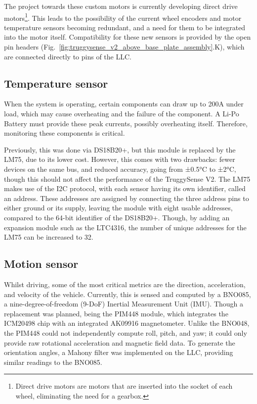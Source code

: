 \documentclass[conference,a4paper]{IEEEtran}
\let\oldsubsection\subsection
\renewcommand{\subsection}[1]{
  \setlength{\parskip}{0.5em}
  \setlength{\parindent}{0pt}
  \oldsubsection{#1}
}
\newcommand{\ParagraphSeperator}{
  \setlength{\parskip}{0em}
  \setlength{\parindent}{10pt}
}
\begin{document}
\ParagraphSeperator
The project towards these custom motors is currently developing direct drive motors\footnote{Direct drive motors are motors that are inserted into the socket of each wheel, eliminating the need for a gearbox.}.
This leads to the possibility of the current wheel encoders and motor temperature sensors becoming redundant, and a need for them to be integrated into the motor itself.
Compatibility for these new sensors is provided by the open pin headers (Fig.~\ref{fig:truggysense_v2_above_base_plate_assembly}.K), which are connected directly to pins of the LLC.

\subsection{Temperature sensor}
\ParagraphSeperator
When the system is operating, certain components can draw up to 200A under load, which may cause overheating and the failure of the component.
A Li-Po Battery must provide these peak currents, possibly overheating itself.
Therefore, monitoring these components is critical.

\ParagraphSeperator
Previously, this was done via DS18B20+, but this module is replaced by the LM75, due to its lower cost.
However, this comes with two drawbacks: fewer devices on the same bus, and reduced accuracy, going from ±0.5°C to ±2°C, though this should not affect the performance of the TruggySense V2.
The LM75 makes use of the I2C protocol, with each sensor having its own identifier, called an address.
These addresses are assigned by connecting the three address pins to either ground or its supply, leaving the module with eight usable addresses, compared to the 64-bit identifier of the DS18B20+.
Though, by adding an expansion module such as the LTC4316, the number of unique addresses for the LM75 can be increased to 32.

\subsection{Motion sensor}
\ParagraphSeperator
Whilst driving, some of the most critical metrics are the direction, acceleration, and velocity of the vehicle.
Currently, this is sensed and computed by a BNO085, a nine-degree-of-freedom (9-DoF) Inertial Measurement Unit (IMU).
Though a replacement was planned, being the PIM448 module, which integrates the ICM20498 chip with an integrated AK09916 magnetometer.
Unlike the BNO048, the PIM448 could not independently compute roll, pitch, and yaw; it could only provide raw rotational acceleration and magnetic field data.
To generate the orientation angles, a Mahony filter was implemented on the LLC, providing similar readings to the BNO085.
\end{document}
